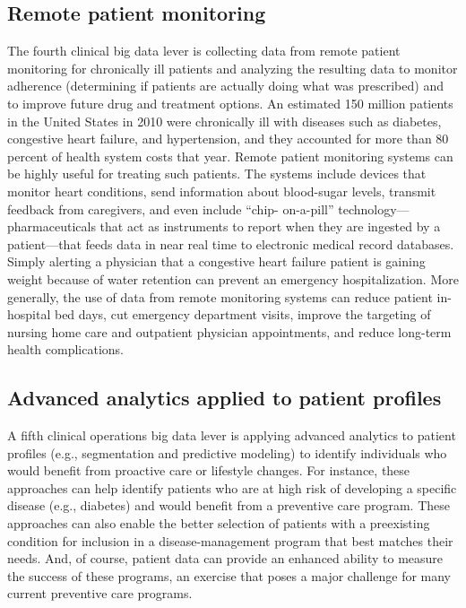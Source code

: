 \documentclass[twocolumn]{article}
\begin{document}
\subsection{Remote patient monitoring} 
The fourth clinical big data lever is collecting data from remote patient monitoring for chronically ill patients and analyzing the resulting data to monitor adherence (determining if patients are actually doing what was prescribed) and to improve future drug and treatment options. An estimated 150 million patients in the United States in 2010 were chronically ill with diseases such as diabetes, congestive heart failure, and hypertension, and they accounted for more than 80 percent of health system costs that year. Remote patient monitoring systems can be highly useful for treating such patients. The systems include devices that monitor heart conditions, send information about blood-sugar levels, transmit feedback from caregivers, and even include “chip- on-a-pill” technology—pharmaceuticals that act as instruments to report when they are ingested by a patient—that feeds data in near real time to electronic
medical record databases. Simply alerting a physician that a congestive heart failure patient is gaining weight because of water retention can prevent an emergency hospitalization. More generally, the use of data from remote monitoring systems can reduce patient in-hospital bed days, cut emergency department visits, improve the targeting of nursing home care and outpatient physician appointments, and reduce long-term health complications.

\subsection{Advanced analytics applied to patient profiles}
A fifth clinical operations big data lever is applying advanced analytics to patient profiles (e.g., segmentation and predictive modeling) to identify individuals who would benefit from proactive care or lifestyle changes. For instance, these approaches can help identify patients who are at high risk of developing a specific disease (e.g., diabetes) and would benefit from
a preventive care program. These approaches can also enable the better selection of patients with a preexisting condition for inclusion in a disease-management program that best matches their needs. And, of course, patient data can provide an enhanced ability to measure the success of these programs, an exercise that poses a major challenge for many current preventive care programs.
\end{document}
